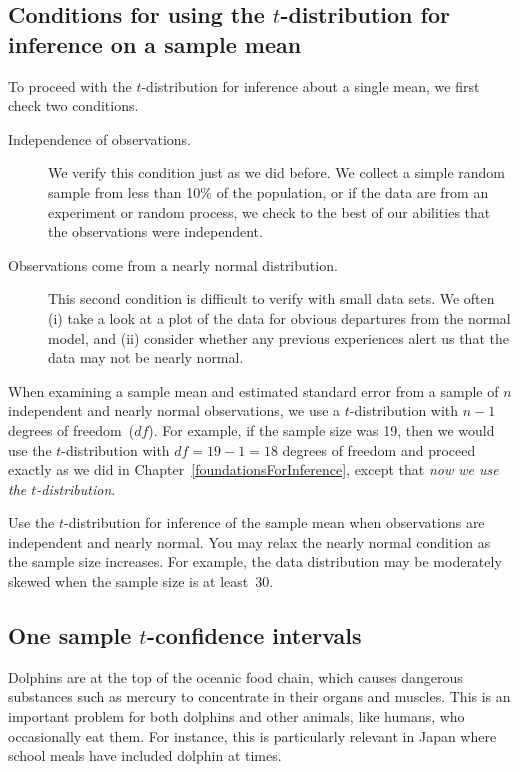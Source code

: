 \subsection{Conditions for using the $t$-distribution for inference on a sample mean}
\label{tDistSolutionToSEProblem}

To proceed with the $t$-distribution for inference about a single mean, we first check two conditions.
\begin{description}
\item[Independence of observations.] We verify this condition just as we did before. We collect a simple random sample from less than 10\% of the population, or if the data are from an experiment or random process, we check to the best of our abilities that the observations were independent.
\item[Observations come from a nearly normal distribution.] This second condition is difficult to verify with small data sets. We often (i) take a look at a plot of the data for obvious departures from the normal model, and (ii) consider whether any previous experiences alert us that the data may not be nearly normal.
\end{description}
When examining a sample mean and estimated standard error from a sample of $n$ independent and nearly normal observations, we use a $t$-distribution with $n-1$ degrees of freedom~($df$). For example, if the sample size was 19, then we would use the $t$-distribution with $df=19-1=18$ degrees of freedom and proceed exactly as we did in Chapter~\ref{foundationsForInference}, except that \emph{now we use the $t$-distribution}.

\begin{tipBox}{
Use the $t$-distribution for inference of the sample mean when observations are independent and nearly normal. You may relax the nearly normal condition as the sample size increases. For example, the data distribution may be moderately skewed when the sample size is at least~30.}
\end{tipBox}


\subsection{One sample $t$-confidence intervals}
\label{oneSampleTConfidenceIntervals}


Dolphins are at the top of the oceanic food chain, which causes dangerous substances such as mercury to concentrate in their organs and muscles. This is an important problem for both dolphins and other animals, like humans, who occasionally eat them. For instance, this is particularly relevant in Japan where school meals have included dolphin at times.
\setlength{\captionwidth}{86mm}

